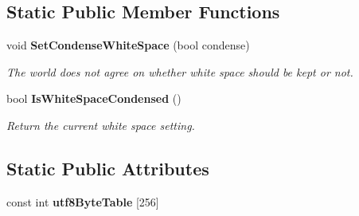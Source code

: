 \subsection*{Static Public Member Functions}
\begin{CompactItemize}
\item 
void {\bf Set\-Condense\-White\-Space} (bool condense)
\begin{CompactList}\small\item\em The world does not agree on whether white space should be kept or not. \item\end{CompactList}\item 
bool {\bf Is\-White\-Space\-Condensed} ()\label{classTiXmlBase_TiXmlUnknowne1}

\begin{CompactList}\small\item\em Return the current white space setting. \item\end{CompactList}\end{CompactItemize}
\subsection*{Static Public Attributes}
\begin{CompactItemize}
\item 
const int {\bf utf8Byte\-Table} [256]
\end{CompactItemize}
